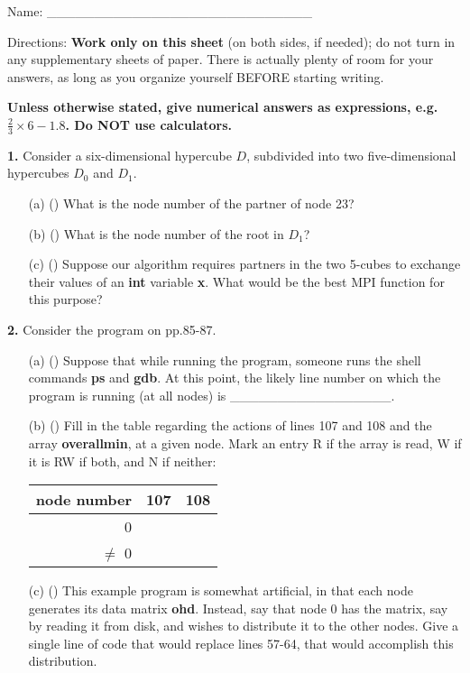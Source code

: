 \documentclass[twocolumn]{article}
\begin{document}
Name: \_\_\_\_\_\_\_\_\_\_\_\_\_\_\_\_\_\_\_\_\_\_\_\_\_\_\_\_

Directions: {\bf \Large Work only on this sheet} (on both sides, if
needed); do not turn in any supplementary sheets of paper. There is
actually plenty of room for your answers, as long as you organize
yourself BEFORE starting writing.

{\bf \Large Unless otherwise stated, give numerical answers as
expressions, e.g. $\frac{2}{3} \times 6 - 1.8$.  Do NOT use
calculators.}

{\bf 1.} Consider a six-dimensional hypercube $D$, subdivided into two
five-dimensional hypercubes $D_0$ and $D_1$.

\begin{itemize}

\item [(a)] () What is the node number of the partner of node 23?

\item [(b)] () What is the node number of the root in $D_1$?

\item [(c)] () Suppose our algorithm requires partners in the two
5-cubes to exchange their values of an {\bf int} variable {\bf x}.
What would be the best MPI function for this purpose?

\end{itemize}

{\bf 2.} Consider the program on pp.85-87.

\begin{itemize}

\item [(a)] () Suppose that while running the program, someone runs the
shell commands {\bf ps} and {\bf gdb}.  At this point, the likely line
number on which the program is running (at all nodes) is
\_\_\_\_\_\_\_\_\_\_\_\_\_\_\_\_\_.

\item [(b)] () Fill in the table regarding the actions of lines 107 and
108 and the array {\bf overallmin}, at a given node.  Mark an entry R if the
array is read, W if it is RW if both, and N if neither:

\begin{tabular}{|r|r|r|}
\hline
node number & 107 & 108 \\ \hline 
0 & \  & \  \\ \hline 
$\neq$ 0 & \  & \  \\ \hline 
\end{tabular}

\item [(c)] () This example program is somewhat artificial, in that each
node generates its data matrix {\bf ohd}.  Instead, say that node 0 has
the matrix, say by reading it from disk, and wishes to distribute it to
the other nodes.  Give a single line of code that would replace lines
57-64, that would accomplish this distribution.

\end{itemize}
\end{document}
